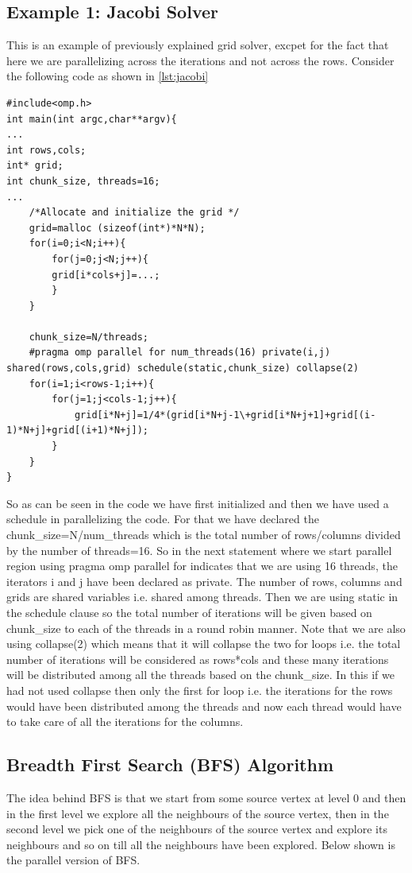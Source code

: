\documentclass[12pt]{article}
\begin{document}
\subsection{Example 1: Jacobi Solver}
This is an example of previously explained grid solver, excpet for the fact that here we are parallelizing across the iterations and not across the rows. Consider the following code as shown in \ref{lst:jacobi}
\begin{lstlisting}[caption={jacobi-solver},captionpos=b,label={lst:jacobi}]
#include<omp.h>
int main(int argc,char**argv){
...
int rows,cols;
int* grid;
int chunk_size, threads=16;
...
    /*Allocate and initialize the grid */
    grid=malloc (sizeof(int*)*N*N);
    for(i=0;i<N;i++){
        for(j=0;j<N;j++){
        grid[i*cols+j]=...;
        }
    }

    chunk_size=N/threads;
    #pragma omp parallel for num_threads(16) private(i,j) shared(rows,cols,grid) schedule(static,chunk_size) collapse(2)
    for(i=1;i<rows-1;i++){
        for(j=1;j<cols-1;j++){
            grid[i*N+j]=1/4*(grid[i*N+j-1\+grid[i*N+j+1]+grid[(i-1)*N+j]+grid[(i+1)*N+j]);
        }
    }
}
\end{lstlisting}
So as can be seen in the code we have first initialized and then we have used a schedule in parallelizing the code.
For that we have declared the chunk\_size=N/num\_threads which is the total number of rows/columns divided by the number of threads=16. So in the next statement where we start parallel region using pragma omp parallel for indicates that we are using 16 threads, the iterators i and j have been declared as private. The number of rows, columns and grids are shared variables i.e. shared among threads. Then we are using static in the schedule clause so the total number of iterations will be given based on chunk\_size to each of the threads in a round robin manner. Note that we are also using collapse(2) which means that it will collapse the two for loops i.e. the total number of iterations will be considered as rows*cols and these many iterations will be distributed among all the threads based on the chunk\_size. In this if we had not used collapse then only the first for loop i.e. the iterations for the rows would have been distributed among the threads and now each thread would have to take care of all the iterations for the columns.

\subsection{Breadth First Search (BFS) Algorithm}
The idea behind BFS is that we start from some source vertex at level 0 and then in the first level we explore all the neighbours of the source vertex, then in the second level we pick one of the neighbours of the source vertex and explore its neighbours and so on till all the neighbours have been explored. Below shown is the parallel version of BFS.
\end{document}
